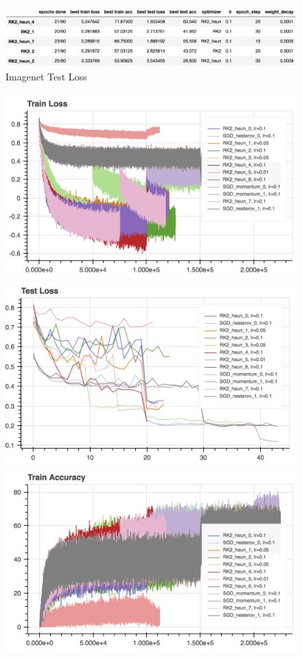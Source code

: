 \begin{figure}[htb]
\includegraphics[scale=0.5]{imagenet_resnet18_train_loss.png}
\caption{Imagenet Test Loss}
\end{figure}

\begin{figure}[htb]
\includegraphics[scale=0.5]{plots/imagenet.png}
\includegraphics[scale=0.5]{plots/imagenet_1.png}
\includegraphics[scale=0.5]{plots/imagenet_2.png}

\end{figure}
